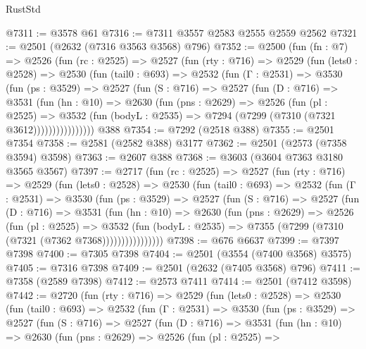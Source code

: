 \begin{lexlean}{RustStd}
\begin{coremodule}
{\begin{coremodule}
{{{{{{{{{{{{{{{{{{{{@7311 := @3578 @61
@7316 := @7311 @3557 @2583 @2555 @2559 @2562
@7321 := @2501 (@2632 (@7316 @3563 @3568) @796)
@7352 := @2500
    (fun (fn : @7) =>
    @2526
      (fun (rc : @2525) =>
      @2527
        (fun (rty : @716) =>
        @2529
          (fun (lets0 : @2528) =>
          @2530
            (fun (tail0 : @693) =>
            @2532
              (fun (Γ : @2531) =>
              @3530
                (fun (ps : @3529) =>
                @2527
                  (fun (S : @716) =>
                  @2527
                    (fun (D : @716) =>
                    @3531
                      (fun (hn : @10) =>
                      @2630
                        (fun (pns : @2629) =>
                        @2526
                          (fun (pl : @2525) =>
                          @3532
                            (fun (bodyL : @2535) => @7294 (@7299 (@7310 (@7321 @3612))))))))))))))))
    @388
@7354 := @7292 (@2518 @388)
@7355 := @2501 @7354
@7358 := @2581 (@2582 @388) @3177
@7362 := @2501 (@2573 (@7358 @3594) @3598)
@7363 := @2607 @388
@7368 := @3603 (@3604 @7363 @3180 @3565 @3567)
@7397 := @2717
    (fun (rc : @2525) =>
    @2527
      (fun (rty : @716) =>
      @2529
        (fun (lets0 : @2528) =>
        @2530
          (fun (tail0 : @693) =>
          @2532
            (fun (Γ : @2531) =>
            @3530
              (fun (ps : @3529) =>
              @2527
                (fun (S : @716) =>
                @2527
                  (fun (D : @716) =>
                  @3531
                    (fun (hn : @10) =>
                    @2630
                      (fun (pns : @2629) =>
                      @2526
                        (fun (pl : @2525) =>
                        @3532
                          (fun (bodyL : @2535) =>
                          @7355 (@7299 (@7310 (@7321 (@7362 @7368))))))))))))))))
@7398 := @676 @6637
@7399 := @7397 @7398
@7400 := @7305 @7398
@7404 := @2501 (@3554 (@7400 @3568) @3575)
@7405 := @7316 @7398
@7409 := @2501 (@2632 (@7405 @3568) @796)
@7411 := @7358 (@2589 @7398)
@7412 := @2573 @7411
@7414 := @2501 (@7412 @3598)
@7442 := @2720
    (fun (rty : @716) =>
    @2529
      (fun (lets0 : @2528) =>
      @2530
        (fun (tail0 : @693) =>
        @2532
          (fun (Γ : @2531) =>
          @3530
            (fun (ps : @3529) =>
            @2527
              (fun (S : @716) =>
              @2527
                (fun (D : @716) =>
                @3531
                  (fun (hn : @10) =>
                  @2630
                    (fun (pns : @2629) =>
                    @2526
                      (fun (pl : @2525) =>
}}}}}}}}}}}}}}}}}}}}
\end{coremodule}}
\end{coremodule}
\end{lexlean}
